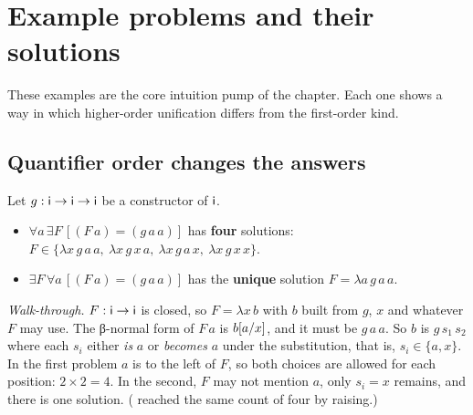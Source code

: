 {%
\section{Example problems and their solutions}\label{sec:lambda-examples}

These examples  are the core intuition pump of the chapter. Each one shows a way in
which higher-order unification differs from the first-order kind.

\subsection{Quantifier order changes the answers}\label{sec:lambda-order}

Let $g:\mathsf{i}\to\mathsf{i}\to\mathsf{i}$ be a constructor of $\mathsf{i}$.
\begin{itemize}
\item $\forall a\,\exists F\,[(F\,a)=(g\,a\,a)]$ has \textbf{four} solutions:
      $F\in\{\lambda x\,g\,a\,a,\allowbreak\ \lambda x\,g\,x\,a,\allowbreak\ \lambda x\,g\,a\,x,\allowbreak\ \lambda x\,g\,x\,x\}$.
\item $\exists F\,\forall a\,[(F\,a)=(g\,a\,a)]$ has the \textbf{unique} solution $F=\lambda a\,g\,a\,a$.
\end{itemize}
\emph{Walk-through.} $F:\mathsf{i}\to\mathsf{i}$ is closed, so $F=\lambda x\,b$ with $b$ built from $g$, $x$ and
whatever $F$ may use. The β-normal form of $F\,a$ is $b[a/x]$, and it must be $g\,a\,a$. So $b$ is
$g\,s_1\,s_2$ where each $s_i$ either \emph{is} $a$ or \emph{becomes} $a$ under the substitution, that is,
$s_i\in\{a,x\}$. In the first problem $a$ is to the left of $F$, so both choices are allowed for each
position: $2\times 2=4$. In the second, $F$ may not mention $a$, only $s_i=x$ remains, and there is one
solution. ( reached the same count of four by raising.)

}
